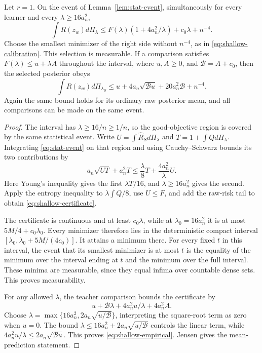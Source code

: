 \begin{theorem}
\label{thm:shallow-abstract}
Let $r=1$. On the event of Lemma~\ref{lem:stat-event}, simultaneously for every learner and every $\lambda\ge16a_n^2$,
\begin{equation}
 \int R(z_w)d\Pi_\lambda
 \le F(\lambda)(1+4a_n^2/\lambda)+c_0\lambda+n^{-4}.
 \label{eq:shallow-certificate}
\end{equation}
Choose the smallest minimizer of the right side without $n^{-4}$, as in \eqref{eq:shallow-calibration}. This selection is measurable. If a comparison satisfies
$F(\lambda)\le u+\lambda A$ throughout the interval, where $u,A\ge0$, and $\mathcal B=A+c_0$, then the selected posterior obeys
\begin{equation}
 \int R(z_w)d\Pi_{\lambda_S}
 \le u+4a_n\sqrt{\mathcal B u}+20a_n^2\mathcal B+n^{-4}.
 \label{eq:shallow-empirical}
\end{equation}
Again the same bound holds for its ordinary raw posterior mean, and all comparisons can be made on the same event.
\end{theorem}
\begin{proof}
The interval has $\lambda\ge16/n\ge1/n$, so the good-objective region is covered by the same statistical event. Write $U=\int\widehat R_Sd\Pi_\lambda$ and $T=1+\int Qd\Pi_\lambda$. Integrating \eqref{eq:stat-event} on that region and using Cauchy--Schwarz bounds its two contributions by
\[
 a_n\sqrt{UT}+a_n^2T
 \le\frac\lambda8T+\frac{4a_n^2}{\lambda}U.
\]
Here Young's inequality gives the first $\lambda T/16$, and $\lambda\ge16a_n^2$ gives the second. Apply the entropy inequality to $\lambda\int Q/8$, use $U\le F$, and add the raw-risk tail to obtain \eqref{eq:shallow-certificate}.

The certificate is continuous and at least $c_0\lambda$, while at $\lambda_0=16a_n^2$ it is at most $5M/4+c_0\lambda_0$. Every minimizer therefore lies in the deterministic compact interval $[\lambda_0,\lambda_0+5M/(4c_0)]$. It attains a minimum there. For every fixed $t$ in this interval, the event that its smallest minimizer is at most $t$ is the equality of the minimum over the interval ending at $t$ and the minimum over the full interval. These minima are measurable, since they equal infima over countable dense sets. This proves measurability.

For any allowed $\lambda$, the teacher comparison bounds the certificate by
\[
 u+\mathcal B\lambda+4a_n^2u/\lambda+4a_n^2A.
\]
Choose $\lambda=\max\{16a_n^2,2a_n\sqrt{u/\mathcal B}\}$, interpreting the square-root term as zero when $u=0$. The bound
$\lambda\le16a_n^2+2a_n\sqrt{u/\mathcal B}$ controls the linear term, while
$4a_n^2u/\lambda\le2a_n\sqrt{\mathcal B u}$. This proves \eqref{eq:shallow-empirical}. Jensen gives the mean-prediction statement.
\end{proof}
